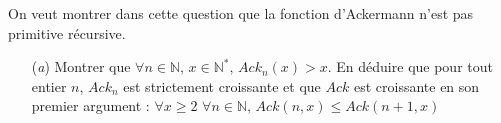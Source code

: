\documentclass[12pt,letterpaper,boxed]{hmcpset}
\begin{document}
\begin{problem}[Question 3]

On veut montrer dans cette question que la fonction d'Ackermann n'est pas primitive récursive.
\begin{itemize}
  \item[(\textit{a})] Montrer que $\forall n \in \mathbb{N}, \, x \in \mathbb{N}^{*}, \, Ack_{n}(x) > x$. En déduire que pour tout entier $n$, $Ack_{n}$ est strictement croissante et que $Ack$ est croissante en son premier argument : $\forall x \geq 2 \, \, \forall n \in \mathbb{N}, \, Ack(n,x) \leq Ack(n+1,x)$
    
\end{itemize}



\end{problem}
\end{document}
